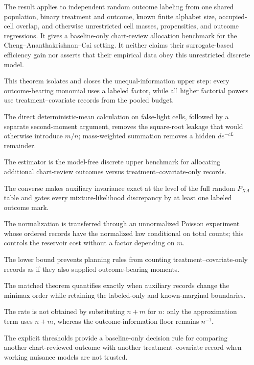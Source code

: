 The result applies to independent random outcome labeling from one shared population, binary treatment and outcome, known finite alphabet size, occupied-cell overlap, and otherwise unrestricted cell masses, propensities, and outcome regressions.  It gives a baseline-only chart-review allocation benchmark for the Cheng--Ananthakrishnan--Cai setting.  It neither claims their surrogate-based efficiency gain nor asserts that their empirical data obey this unrestricted discrete model.

This theorem isolates and closes the unequal-information upper step: every outcome-bearing monomial uses a labeled factor, while all higher factorial powers use treatment--covariate records from the pooled budget.

The direct deterministic-mean calculation on false-light cells, followed by a separate second-moment argument, removes the square-root leakage that would otherwise introduce \(m/n\); mass-weighted summation removes a hidden \(d e^{-cL}\) remainder.

The estimator is the model-free discrete upper benchmark for allocating additional chart-review outcomes versus treatment--covariate-only records.

The converse makes auxiliary invariance exact at the level of the full random \(P_{XA}\) table and gates every mixture-likelihood discrepancy by at least one labeled outcome mark.

The normalization is transferred through an unnormalized Poisson experiment whose ordered records have the normalized law conditional on total counts; this controls the reservoir cost without a factor depending on \(m\).

The lower bound prevents planning rules from counting treatment--covariate-only records as if they also supplied outcome-bearing moments.

The matched theorem quantifies exactly when auxiliary records change the minimax order while retaining the labeled-only and known-marginal boundaries.

The rate is not obtained by substituting \(n+m\) for \(n\): only the approximation term uses \(n+m\), whereas the outcome-information floor remains \(n^{-1}\).

The explicit thresholds provide a baseline-only decision rule for comparing another chart-reviewed outcome with another treatment--covariate record when working nuisance models are not trusted.
